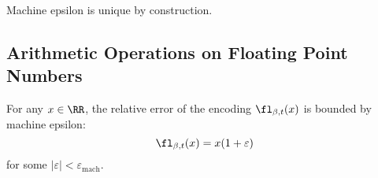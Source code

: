 \begin{rmk}
Machine epsilon is unique by construction.
\end{rmk}

\subsection{Arithmetic Operations on Floating Point Numbers}

\begin{prop}
For any $x\in\RR$, the relative error of the encoding $\fl_{\beta,t}(x)$
is bounded by machine epsilon:
\begin{equation}
  \fl_{\beta,t}(x) = x(1 + \varepsilon)
\end{equation}
for some $|\varepsilon|<\varepsilon_{\text{mach}}$.
\end{prop}

